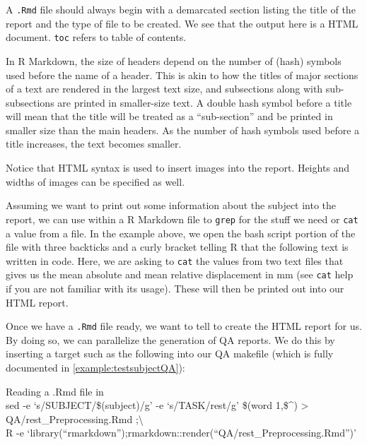 A \texttt{.Rmd} file should always begin with a demarcated section listing the title of the report and the type of file to be created. We see that the output here is a HTML document. \texttt{toc} refers to table of contents. %

In R Markdown, the size of headers depend on the number of \mypound (hash) symbols used before the name of a header. This is akin to how the titles of major sections of a text are rendered in the largest text size, and subsections along with sub-subsections are printed in smaller-size text. A double hash symbol before a title will mean that the title will be treated as a ``sub-section'' and be printed in smaller size than the main headers. As the number of hash symbols used before a title increases, the text becomes smaller.

Notice that HTML syntax is used to insert images into the report. Heights and widths of images can be specified as well. 

Assuming we want to print out some information about the subject into the report, we can use \bashn{} within a R Markdown file to \texttt{grep} for the stuff we need or \texttt{cat} a value from a file. In the example above, we open the bash script portion of the file with three backticks and a curly bracket telling R that the following text is written in \bashn{} code. Here, we are asking \bashn{} to \texttt{cat} the values from two text files that gives us the mean absolute and mean relative displacement in mm (see \texttt{cat} help if you are not familiar with its usage). These will then be printed out into our HTML report.

Once we have a \texttt{.Rmd} file ready, we want to tell \maken{} to create the HTML report for us. By doing so, we can parallelize the generation of QA reports. We do this by inserting a target such as the following into our QA makefile (which is fully documented in \autoref{example:testsubjectQA}):

\begin{make}{Reading a .Rmd file in \maken{}}{}
 \\
\tab sed -e `s/SUBJECT/\$(subject)/g' -e `s/TASK/rest/g' \$(word 1,\$\textasciicircum{}) > QA/rest\_Preprocessing.Rmd ;\textbackslash{} \\
\tab R -e `library(``rmarkdown'');rmarkdown::render(``QA/rest\_Preprocessing.Rmd'')' \\
\end{make}

